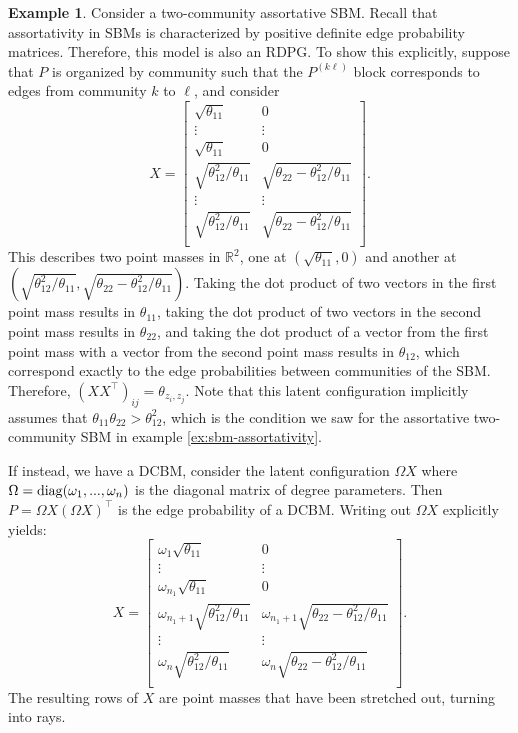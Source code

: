 \documentclass[
  11pt,
]{article}
\theoremstyle{definition}
\theoremstyle{definition}
\newtheorem{example}{Example}[section]
\theoremstyle{definition}
\theoremstyle{definition}
\theoremstyle{remark}
\begin{document}
\begin{example}
Consider a two-community assortative SBM. 
Recall that assortativity in SBMs is characterized by positive definite edge probability matrices. 
Therefore, this model is also an RDPG. 
To show this explicitly, suppose that $P$ is organized by community such that the $P^{(k \ell)}$ block corresponds to edges from community $k$ to $\ell$, and consider 
$$X = \begin{bmatrix}
\sqrt{\theta_{11}} & 0 \\ 
\vdots & \vdots \\ 
\sqrt{\theta_{11}} & 0 \\ 
\sqrt{\theta_{12}^2 / \theta_{11}} & \sqrt{\theta_{22} - \theta_{12}^2 / \theta_{11}} \\ 
\vdots & \vdots \\
\sqrt{\theta_{12}^2 / \theta_{11}} & \sqrt{\theta_{22} - \theta_{12}^2 / \theta_{11}} \\ 
\end{bmatrix}.$$
This describes two point masses in $\mathbb{R}^2$, one at $(\sqrt{\theta_{11}}, 0)$ and another at $(\sqrt{\theta_{12}^2 / \theta_{11}}, \sqrt{\theta_{22} - \theta_{12}^2 / \theta_{11}})$. 
Taking the dot product of two vectors in the first point mass results in $\theta_{11}$, taking the dot product of two vectors in the second point mass results in $\theta_{22}$, and taking the dot product of a vector from the first point mass with a vector from the second point mass results in $\theta_{12}$, which correspond exactly to the edge probabilities between communities of the SBM. 
Therefore, $(X X^\top)_{ij} = \theta_{z_i, z_j}$. 
Note that this latent configuration implicitly assumes that $\theta_{11} \theta_{22} > \theta_{12}^2$, which is the condition we saw for the assortative two-community SBM in example \ref{ex:sbm-assortativity}.

If instead, we have a DCBM, consider the latent configuration $\Omega X$ where $\Omega = \mathrm{diag}(\omega_1, ..., \omega_n)$ is the diagonal matrix of degree parameters. 
Then $P = \Omega X (\Omega X)^\top$ is the edge probability of a DCBM. 
Writing out $\Omega X$ explicitly yields:
$$X = \begin{bmatrix}
\omega_1 \sqrt{\theta_{11}} & 0 \\ 
\vdots & \vdots \\ 
\omega_{n_1} \sqrt{\theta_{11}} & 0 \\ 
\omega_{n_1 + 1} \sqrt{\theta_{12}^2 / \theta_{11}} & \omega_{n_1 + 1} \sqrt{\theta_{22} - \theta_{12}^2 / \theta_{11}} \\ 
\vdots & \vdots \\
\omega_n \sqrt{\theta_{12}^2 / \theta_{11}} & \omega_n \sqrt{\theta_{22} - \theta_{12}^2 / \theta_{11}} \\ 
\end{bmatrix}.$$
The resulting rows of $X$ are point masses that have been stretched out, turning into rays. 
\end{example}
\end{document}
